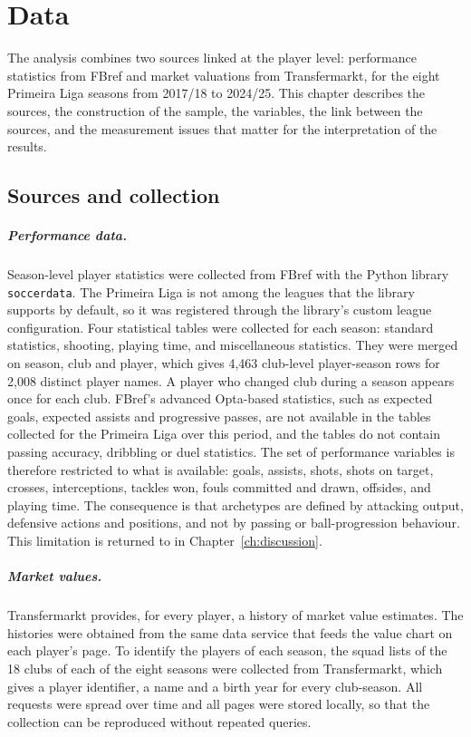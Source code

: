 \chapter{Data}
\label{ch:data}

The analysis combines two sources linked at the player level: performance statistics from FBref and market valuations from Transfermarkt, for the eight Primeira Liga seasons from 2017/18 to 2024/25. This chapter describes the sources, the construction of the sample, the variables, the link between the sources, and the measurement issues that matter for the interpretation of the results.

\section{Sources and collection}
\label{sec:data-sources}

\paragraph{Performance data.} Season-level player statistics were collected from FBref with the Python library \texttt{soccerdata}. The Primeira Liga is not among the leagues that the library supports by default, so it was registered through the library's custom league configuration. Four statistical tables were collected for each season: standard statistics, shooting, playing time, and miscellaneous statistics. They were merged on season, club and player, which gives 4,463 club-level player-season rows for 2,008 distinct player names. A player who changed club during a season appears once for each club. FBref's advanced Opta-based statistics, such as expected goals, expected assists and progressive passes, are not available in the tables collected for the Primeira Liga over this period, and the tables do not contain passing accuracy, dribbling or duel statistics. The set of performance variables is therefore restricted to what is available: goals, assists, shots, shots on target, crosses, interceptions, tackles won, fouls committed and drawn, offsides, and playing time. The consequence is that archetypes are defined by attacking output, defensive actions and positions, and not by passing or ball-progression behaviour. This limitation is returned to in Chapter~\ref{ch:discussion}.

\paragraph{Market values.} Transfermarkt provides, for every player, a history of market value estimates. The histories were obtained from the same data service that feeds the value chart on each player's page. To identify the players of each season, the squad lists of the 18 clubs of each of the eight seasons were collected from Transfermarkt, which gives a player identifier, a name and a birth year for every club-season. All requests were spread over time and all pages were stored locally, so that the collection can be reproduced without repeated queries.

